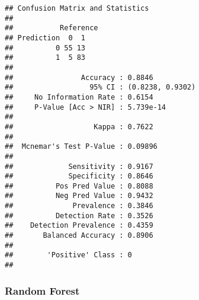 \documentclass[
]{article}
\newenvironment{Shaded}{\begin{snugshade}}{\end{snugshade}}
\newcommand{\AttributeTok}[1]{\textcolor[rgb]{0.77,0.63,0.00}{#1}}
\newcommand{\DecValTok}[1]{\textcolor[rgb]{0.00,0.00,0.81}{#1}}
\newcommand{\FunctionTok}[1]{\textcolor[rgb]{0.00,0.00,0.00}{#1}}
\newcommand{\NormalTok}[1]{#1}
\newcommand{\OtherTok}[1]{\textcolor[rgb]{0.56,0.35,0.01}{#1}}
\newcommand{\SpecialCharTok}[1]{\textcolor[rgb]{0.00,0.00,0.00}{#1}}
\begin{document}
\begin{verbatim}
## Confusion Matrix and Statistics
## 
##           Reference
## Prediction  0  1
##          0 55 13
##          1  5 83
##                                           
##                Accuracy : 0.8846          
##                  95% CI : (0.8238, 0.9302)
##     No Information Rate : 0.6154          
##     P-Value [Acc > NIR] : 5.739e-14       
##                                           
##                   Kappa : 0.7622          
##                                           
##  Mcnemar's Test P-Value : 0.09896         
##                                           
##             Sensitivity : 0.9167          
##             Specificity : 0.8646          
##          Pos Pred Value : 0.8088          
##          Neg Pred Value : 0.9432          
##              Prevalence : 0.3846          
##          Detection Rate : 0.3526          
##    Detection Prevalence : 0.4359          
##       Balanced Accuracy : 0.8906          
##                                           
##        'Positive' Class : 0               
## 
\end{verbatim}

\hypertarget{random-forest}{%
\subsubsection{Random Forest}\label{random-forest}}

\begin{Shaded}
\end{Shaded}
\end{document}
